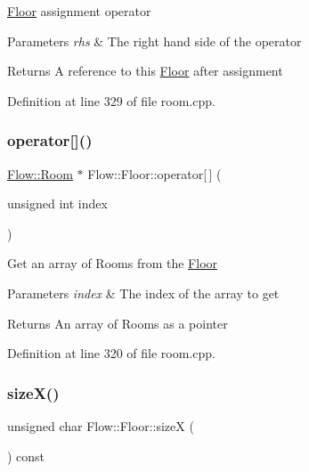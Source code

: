 \hyperlink{class_flow_1_1_floor}{Floor} assignment operator 
\begin{DoxyParams}{Parameters}
{\em rhs} & The right hand side of the operator \\
\hline
\end{DoxyParams}
\begin{DoxyReturn}{Returns}
A reference to this \hyperlink{class_flow_1_1_floor}{Floor} after assignment 
\end{DoxyReturn}


Definition at line 329 of file room.\+cpp.

\hypertarget{class_flow_1_1_floor_a4b76afdb21d1687bd9ed0d37e09a15d7}{}\label{class_flow_1_1_floor_a4b76afdb21d1687bd9ed0d37e09a15d7} 
\subsubsection{\texorpdfstring{operator[]()}{operator[]()}}
{\footnotesize\ttfamily \hyperlink{class_flow_1_1_room}{Flow\+::\+Room} $\ast$ Flow\+::\+Floor\+::operator\mbox{[}$\,$\mbox{]} (\begin{DoxyParamCaption}\item[{unsigned int}]{index }\end{DoxyParamCaption})}

Get an array of Rooms from the \hyperlink{class_flow_1_1_floor}{Floor} 
\begin{DoxyParams}{Parameters}
{\em index} & The index of the array to get \\
\hline
\end{DoxyParams}
\begin{DoxyReturn}{Returns}
An array of Rooms as a pointer 
\end{DoxyReturn}


Definition at line 320 of file room.\+cpp.

\hypertarget{class_flow_1_1_floor_ad56ae970e75d1be616164efd2f84125b}{}\label{class_flow_1_1_floor_ad56ae970e75d1be616164efd2f84125b} 
\subsubsection{\texorpdfstring{size\+X()}{sizeX()}}
{\footnotesize\ttfamily unsigned char Flow\+::\+Floor\+::sizeX (\begin{DoxyParamCaption}{ }\end{DoxyParamCaption}) const}

